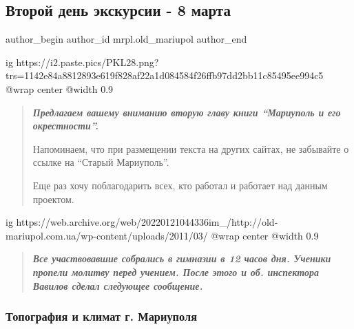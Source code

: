  
 
 
 
 
 
\subsection{Второй день экскурсии - 8 марта}
\label{sec:25_03_2011.stz.mrpl.old_mariupol.1.vtoroj_den_ekskursii_8_marta}
 
\ifcmt
 author_begin
   author_id mrpl.old_mariupol
 author_end
\fi

\ifcmt
  ig https://i2.paste.pics/PKL28.png?trs=1142e84a8812893e619f828af22a1d084584f26ffb97dd2bb11c85495ee994c5
  @wrap center
  @width 0.9
\fi

\begin{quote}
\em\bfseries
Предлагаем вашему вниманию вторую главу книги \enquote{Мариуполь и его окрестности}.

Напоминаем, что при размещении текста на других сайтах, не забывайте о ссылке
на \enquote{Старый Мариуполь}.

Еще раз хочу поблагодарить всех, кто работал и работает над данным проектом.
\end{quote}

\ifcmt
  ig https://web.archive.org/web/20220121044336im_/http://old-mariupol.com.ua/wp-content/uploads/2011/03/%
  @wrap center
  @width 0.9
\fi

\begin{quote}
\em\bfseries
Все участвовавшие собрались в гимназии в 12 часов дня. Ученики пропели молитву
перед учением. После этого и об. инспектора Вавилов сделал следующее сообщение.	
\end{quote}

\subsubsection{Топография и климат г. Мариуполя}

